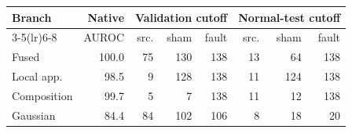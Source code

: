 \begin{tabular}{lrrrrrrr}
\toprule
Branch & Native & \multicolumn{3}{c}{Validation cutoff} & \multicolumn{3}{c}{Normal-test cutoff} \\
\cmidrule(lr){3-5}\cmidrule(lr){6-8}
 & AUROC & src. & sham & fault & src. & sham & fault \\
\midrule
Fused & 100.0 & 75 & 130 & 138 & 13 & 64 & 138 \\
Local app. & 98.5 & 9 & 128 & 138 & 11 & 124 & 138 \\
Composition & 99.7 & 5 & 7 & 138 & 11 & 12 & 138 \\
Gaussian & 84.4 & 84 & 102 & 106 & 8 & 18 & 20 \\
\bottomrule
\end{tabular}
